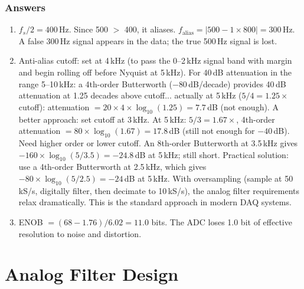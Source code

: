\documentclass[11pt,letterpaper,twoside,openany]{book}
\begin{document}
\subsection{Answers}
\begin{enumerate}[leftmargin=1.5em]
\item $f_s/2 = 400$\,Hz. Since 500 $>$ 400, it aliases. $f_{\text{alias}} = |500 - 1 \times 800| = 300$\,Hz. A false 300\,Hz signal appears in the data; the true 500\,Hz signal is lost.
\item Anti-alias cutoff: set at 4\,kHz (to pass the 0--2\,kHz signal band with margin and begin rolling off before Nyquist at 5\,kHz). For 40\,dB attenuation in the range 5--10\,kHz: a 4th-order Butterworth ($-80$\,dB/decade) provides 40\,dB attenuation at 1.25 decades above cutoff... actually at 5\,kHz ($5/4 = 1.25\times$ cutoff): attenuation $= 20 \times 4 \times \log_{10}(1.25) = 7.7$\,dB (not enough). A better approach: set cutoff at 3\,kHz. At 5\,kHz: $5/3 = 1.67\times$, 4th-order attenuation $= 80 \times \log_{10}(1.67) = 17.8$\,dB (still not enough for $-40$\,dB). Need higher order or lower cutoff. An 8th-order Butterworth at 3.5\,kHz gives $-160 \times \log_{10}(5/3.5) = -24.8$\,dB at 5\,kHz; still short. Practical solution: use a 4th-order Butterworth at 2.5\,kHz, which gives $-80 \times \log_{10}(5/2.5) = -24$\,dB at 5\,kHz. With oversampling (sample at 50\,kS/s, digitally filter, then decimate to 10\,kS/s), the analog filter requirements relax dramatically. This is the standard approach in modern DAQ systems.
\item ENOB $= (68 - 1.76)/6.02 = 11.0$ bits. The ADC loses 1.0 bit of effective resolution to noise and distortion.
\end{enumerate}


\chapter{Analog Filter Design}
\label{ch:analog_filters}
\end{document}
